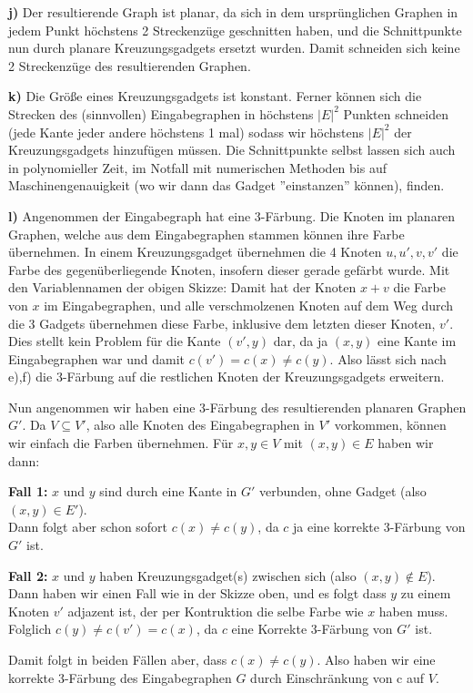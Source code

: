 \documentclass[a4paper,graphics,11pt]{article}
\begin{document}
\textbf{j)}
Der resultierende Graph ist planar, da sich in dem ursprünglichen Graphen in jedem Punkt höchstens 2 Streckenzüge
geschnitten haben, und die Schnittpunkte nun durch planare Kreuzungsgadgets ersetzt wurden. Damit schneiden sich
keine 2 Streckenzüge des resultierenden Graphen.

\textbf{k)}
Die Größe eines Kreuzungsgadgets ist konstant. Ferner können sich die Strecken des (sinnvollen) Eingabegraphen in höchstens $|E|^2$
Punkten schneiden (jede Kante jeder andere höchstens 1 mal) sodass wir höchstens $|E|^2$ der Kreuzungsgadgets
hinzufügen müssen. Die Schnittpunkte selbst lassen sich auch in polynomieller Zeit,
im Notfall mit numerischen Methoden bis auf Maschinengenauigkeit (wo wir dann das Gadget ''einstanzen'' können), finden.

\textbf{l)}
Angenommen der Eingabegraph hat eine 3-Färbung. Die Knoten im planaren Graphen, welche aus dem Eingabegraphen stammen
können ihre Farbe übernehmen. In einem Kreuzungsgadget übernehmen die 4 Knoten $u,u',v,v'$ die Farbe des gegenüberliegende Knoten,
insofern dieser gerade gefärbt wurde. Mit den Variablennamen der obigen Skizze: Damit hat der Knoten $x+v$ die Farbe von
$x$ im Eingabegraphen, und alle verschmolzenen Knoten auf dem Weg durch die 3 Gadgets übernehmen diese Farbe, inklusive
dem letzten dieser Knoten, $v'$. Dies stellt kein Problem für die Kante $(v',y)$ dar, da ja $(x,y)$ eine Kante im Eingabegraphen
war und damit $c(v') = c(x) \neq c(y)$. Also lässt sich nach e),f) die 3-Färbung auf die restlichen Knoten der Kreuzungsgadgets
erweitern.

Nun angenommen wir haben eine 3-Färbung des resultierenden planaren Graphen $G'$. Da $V \subseteq V'$, also alle Knoten
des Eingabegraphen in $V'$ vorkommen, können wir einfach die Farben übernehmen. Für $x,y \in V$ mit $(x,y) \in E$ haben wir dann:

\textbf{Fall 1:} $x$ und $y$ sind durch eine Kante in $G'$ verbunden, ohne Gadget (also $(x,y) \in E'$).\\
Dann folgt aber schon sofort $c(x) \neq c(y)$, da $c$ ja eine korrekte 3-Färbung von $G'$ ist.

\textbf{Fall 2:} $x$ und $y$ haben Kreuzungsgadget(s) zwischen sich (also $(x,y) \notin E$).\\
Dann haben wir einen Fall wie in der Skizze oben, und es folgt dass $y$ zu einem Knoten $v'$ adjazent ist,
der per Kontruktion die selbe Farbe wie $x$ haben muss. Folglich $c(y) \neq c(v') = c(x)$, da $c$ eine Korrekte
3-Färbung von $G'$ ist.

Damit folgt in beiden Fällen aber, dass $c(x) \neq c(y)$. Also haben wir eine korrekte 3-Färbung des Eingabegraphen $G$
durch Einschränkung von c auf $V$.
\end{document}
